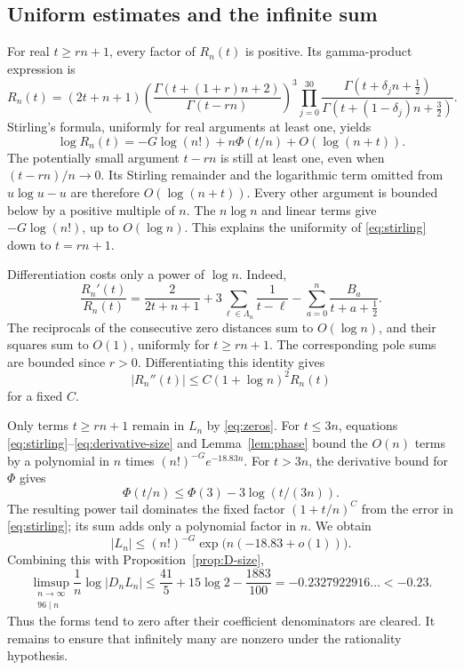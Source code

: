 \subsection{Uniform estimates and the infinite sum}
For real $t\ge rn+1$, every factor of $R_n(t)$ is positive. Its
gamma-product expression is
\[
 R_n(t)=(2t+n+1)
 \left(\frac{\Gamma(t+(1+r)n+2)}{\Gamma(t-rn)}\right)^3
 \prod_{j=0}^{30}
 \frac{\Gamma(t+\delta_jn+\tfrac12)}
      {\Gamma(t+(1-\delta_j)n+\tfrac32)}.
\]
Stirling's formula, uniformly for real arguments at least one, yields
\begin{equation}\label{eq:stirling}
 \log R_n(t)=-G\log(n!)+n\Phi(t/n)+O(\log(n+t)).
\end{equation}
The potentially small argument $t-rn$ is still at least one, even
when $(t-rn)/n\to0$. Its Stirling remainder and the logarithmic
term omitted from $u\log u-u$ are therefore $O(\log(n+t))$.
Every other argument is bounded below by a positive multiple of $n$.
The $n\log n$ and linear terms give $-G\log(n!)$, up to $O(\log n)$.
This explains the uniformity of \eqref{eq:stirling} down to $t=rn+1$.

Differentiation costs only a power of $\log n$. Indeed,
\[
 \frac{R_n'(t)}{R_n(t)}
 =\frac{2}{2t+n+1}+3\sum_{\ell\in\Lambda_n}\frac1{t-\ell}
                       -\sum_{a=0}^{n}\frac{B_a}{t+a+\tfrac12}.
\]
The reciprocals of the consecutive zero distances sum to $O(\log n)$,
and their squares sum to $O(1)$, uniformly for $t\ge rn+1$.
The corresponding pole sums are bounded since $r>0$. Differentiating
this identity gives
\begin{equation}\label{eq:derivative-size}
 |R_n''(t)|\le C(1+\log n)^2R_n(t)
\end{equation}
for a fixed $C$.

Only terms $t\ge rn+1$ remain in $L_n$ by \eqref{eq:zeros}.
For $t\le3n$, equations \eqref{eq:stirling}--\eqref{eq:derivative-size}
and Lemma~\ref{lem:phase} bound the $O(n)$ terms by a polynomial
in $n$ times $(n!)^{-G}e^{-18.83n}$. For $t>3n$, the derivative
bound for $\Phi$ gives
\[
 \Phi(t/n)\le\Phi(3)-3\log(t/(3n)).
\]
The resulting power tail dominates the fixed factor $(1+t/n)^C$
from the error in \eqref{eq:stirling}; its sum adds only a polynomial
factor in $n$. We obtain
\begin{equation}\label{eq:L-size}
 |L_n|\le(n!)^{-G}\exp\bigl(n(-18.83+o(1))\bigr).
\end{equation}
Combining this with Proposition~\ref{prop:D-size},
\begin{equation}\label{eq:cleared-decay}
 \limsup_{\substack{n\to\infty\\96\mid n}}
       \frac1n\log|D_nL_n|
 \le\frac{41}{5}+15\log2-\frac{1883}{100}
 =-0.2327922916\ldots<-0.23.
\end{equation}
Thus the forms tend to zero after their coefficient denominators are
cleared. It remains to ensure that infinitely many are nonzero under
the rationality hypothesis.
